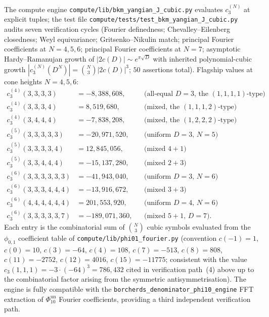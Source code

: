 \begin{remark}
\label{rem:bkm-drinfeld-J-engine}
The compute engine
\texttt{compute/lib/bkm\_yangian\_J\_cubic.py} evaluates $c_3^{(N)}$
at explicit tuples; the test file
\texttt{compute/tests/test\_bkm\_yangian\_J\_cubic.py} audits seven
verification cycles (Fourier definedness; Chevalley--Eilenberg
closedness; Weyl equivariance; Gritsenko--Nikulin match; principal
Fourier coefficients at $N=4,5,6$; principal Fourier coefficients
at $N=7$; asymptotic Hardy--Ramanujan growth of
$|2c(D)|\sim e^{\pi\sqrt D}$ with inherited polynomial-cubic growth
$|c_3^{(N)}(D^N)|=\binom N3|2c(D)|^3$; $50$ assertions total).
Flagship values at cone heights $N=4,5,6$:
\[
\begin{aligned}
c_3^{(4)}(3,3,3,3) &= -8{,}388{,}608,
&&\text{(all-equal $D=3$, the $(1,1,1,1)$-type)}\\
c_3^{(4)}(3,3,3,4) &= 8{,}519{,}680,
&&\text{(mixed, the $(1,1,1,2)$-type)}\\
c_3^{(4)}(3,4,4,4) &= -7{,}838{,}208,
&&\text{(mixed, the $(1,2,2,2)$-type)}\\
c_3^{(5)}(3,3,3,3,3) &= -20{,}971{,}520,
&&\text{(uniform $D=3$, $N=5$)}\\
c_3^{(5)}(3,3,3,3,4) &= 12{,}845{,}056,
&&\text{(mixed $4\!+\!1$)}\\
c_3^{(5)}(3,3,4,4,4) &= -15{,}137{,}280,
&&\text{(mixed $2\!+\!3$)}\\
c_3^{(6)}(3,3,3,3,3,3) &= -41{,}943{,}040,
&&\text{(uniform $D=3$, $N=6$)}\\
c_3^{(6)}(3,3,3,4,4,4) &= -13{,}916{,}672,
&&\text{(mixed $3\!+\!3$)}\\
c_3^{(6)}(4,4,4,4,4,4) &= 201{,}553{,}920,
&&\text{(uniform $D=4$, $N=6$)}\\
c_3^{(6)}(3,3,3,3,3,7) &= -189{,}071{,}360,
&&\text{(mixed $5\!+\!1$, $D=7$)}.
\end{aligned}
\]
Each entry is the combinatorial sum of
$\binom{N}{3}$ cubic symbols evaluated from the $\phi_{0,1}$
coefficient table of \texttt{compute/lib/phi01\_fourier.py}
(convention $c(-1)=1$, $c(0)=10$, $c(3)=-64$, $c(4)=108$,
$c(7)=-513$, $c(8)=808$, $c(11)=-2752$, $c(12)=4016$, $c(15)=-11775$;
consistent with the value
$c_3(1,1,1)=-3\cdot(-64)^3=786{,}432$ cited in verification path~(4)
above up to the combinatorial factor arising from the symmetric
antisymmetrisation). The engine is fully compatible with the
\texttt{borcherds\_denominator\_phi10\_engine} FFT extraction of
\(\Phi_{10}^{\mathrm{un}}\) Fourier coefficients, providing a third independent
verification path.
\end{remark}


